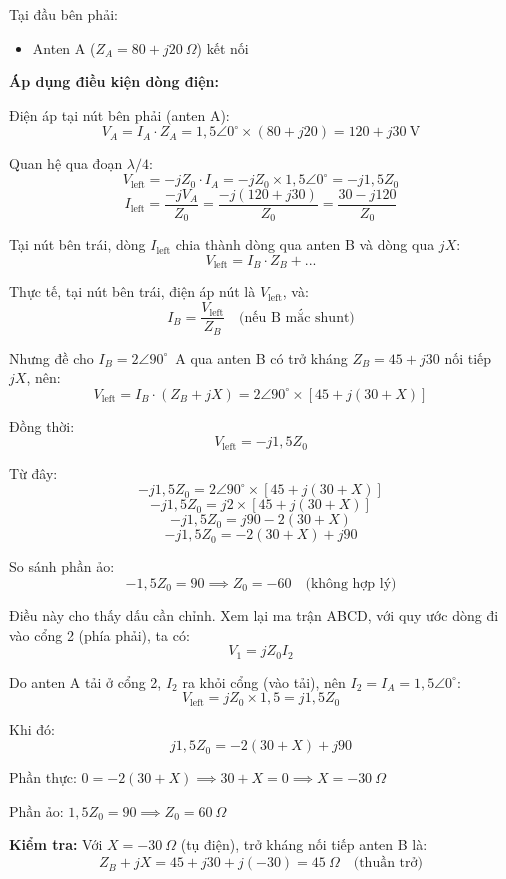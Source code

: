 \documentclass[12pt,a4paper]{article}
\begin{document}
Tại đầu bên phải:
\begin{itemize}
    \item Anten A ($Z_A = 80 + j20~\Omega$) kết nối
\end{itemize}

\textbf{Áp dụng điều kiện dòng điện:}

Điện áp tại nút bên phải (anten A):
\[
V_A = I_A \cdot Z_A = 1{,}5\angle 0^\circ \times (80 + j20) = 120 + j30~\text{V}
\]

Quan hệ qua đoạn $\lambda/4$:
\[
V_{\text{left}} = -jZ_0 \cdot I_A = -jZ_0 \times 1{,}5\angle 0^\circ = -j1{,}5Z_0
\]
\[
I_{\text{left}} = \frac{-jV_A}{Z_0} = \frac{-j(120 + j30)}{Z_0} = \frac{30 - j120}{Z_0}
\]

Tại nút bên trái, dòng $I_{\text{left}}$ chia thành dòng qua anten B và dòng qua $jX$:
\[
V_{\text{left}} = I_B \cdot Z_B + \text{...}
\]

Thực tế, tại nút bên trái, điện áp nút là $V_{\text{left}}$, và:
\[
I_B = \frac{V_{\text{left}}}{Z_B} \quad \text{(nếu B mắc shunt)}
\]

Nhưng đề cho $I_B = 2\angle 90^\circ$~A qua anten B có trở kháng $Z_B = 45 + j30$ nối tiếp $jX$, nên:
\[
V_{\text{left}} = I_B \cdot (Z_B + jX) = 2\angle 90^\circ \times [45 + j(30 + X)]
\]

Đồng thời:
\[
V_{\text{left}} = -j1{,}5Z_0
\]

Từ đây:
\[
-j1{,}5Z_0 = 2\angle 90^\circ \times [45 + j(30 + X)]
\]
\[
-j1{,}5Z_0 = j2 \times [45 + j(30 + X)]
\]
\[
-j1{,}5Z_0 = j90 - 2(30 + X)
\]
\[
-j1{,}5Z_0 = -2(30 + X) + j90
\]

So sánh phần ảo:
\[
-1{,}5Z_0 = 90 \implies Z_0 = -60 \quad \text{(không hợp lý)}
\]

Điều này cho thấy dấu cần chỉnh. Xem lại ma trận ABCD, với quy ước dòng đi vào cổng 2 (phía phải), ta có:
\[
V_1 = jZ_0 I_2
\]

Do anten A tải ở cổng 2, $I_2$ ra khỏi cổng (vào tải), nên $I_2 = I_A = 1{,}5\angle 0^\circ$:
\[
V_{\text{left}} = jZ_0 \times 1{,}5 = j1{,}5Z_0
\]

Khi đó:
\[
j1{,}5Z_0 = -2(30 + X) + j90
\]

Phần thực: $0 = -2(30 + X) \implies 30 + X = 0 \implies \boxed{X = -30~\Omega}$

Phần ảo: $1{,}5Z_0 = 90 \implies \boxed{Z_0 = 60~\Omega}$

\textbf{Kiểm tra:} Với $X = -30~\Omega$ (tụ điện), trở kháng nối tiếp anten B là:
\[
Z_B + jX = 45 + j30 + j(-30) = 45~\Omega \quad \text{(thuần trở)}
\]
\end{document}
